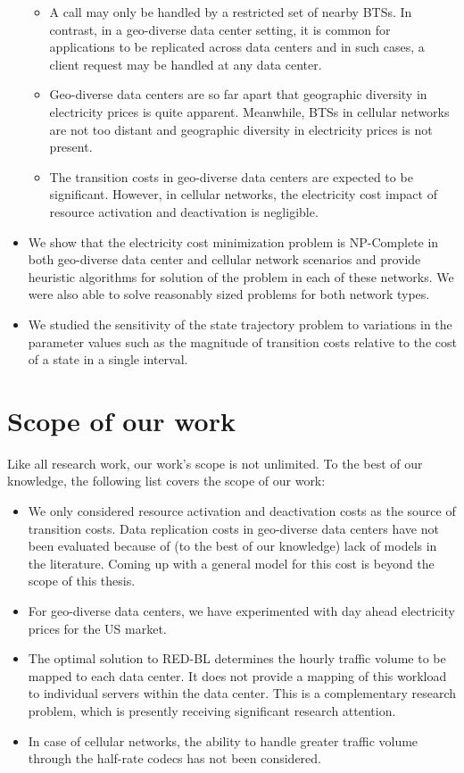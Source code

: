 \begin{itemize}
\begin{itemize}
	\item A call may only be handled by a restricted set of nearby BTSs. In contrast, in a geo-diverse data center setting, it is common for applications to be replicated across data centers and in such cases, a client request may be handled at any data center.
	\item Geo-diverse data centers are so far apart that geographic diversity in electricity prices is quite apparent. Meanwhile, BTSs in cellular networks are not too distant and geographic diversity in electricity prices is not present.
	\item The transition costs in geo-diverse data centers are expected to be significant. However, in cellular networks, the electricity cost impact of resource activation and deactivation is negligible.
	\end{itemize}
\item We show that the electricity cost minimization problem is NP-Complete in both geo-diverse data center and cellular network scenarios and provide heuristic algorithms for solution of the problem in each of these networks. We were also able to solve reasonably sized problems for both network types.
\item We studied the sensitivity of the state trajectory problem to variations in the parameter values such as the magnitude of transition costs relative to the cost of a state in a single interval.
\end{itemize}

\section{Scope of our work} Like all research work, our work's scope is not unlimited. To the best of our knowledge, the following list covers the scope of our work:
\begin{itemize}
\item We only considered resource activation and deactivation costs as the source of transition costs. Data replication costs in geo-diverse data centers have not been evaluated because of (to the best of our knowledge) lack of models in the literature. Coming up with a general model for this cost is beyond the scope of this thesis.
\item For geo-diverse data centers, we have experimented with day ahead electricity prices for the US market. 
\item The optimal solution to RED-BL determines the hourly traffic volume to be mapped to each data center. It does not provide a mapping of this workload to individual servers within the data center. This is a complementary research problem, which is presently receiving significant research attention.
\item In case of cellular networks, the ability to handle greater traffic volume through the half-rate codecs has not been considered.
\end{itemize}

